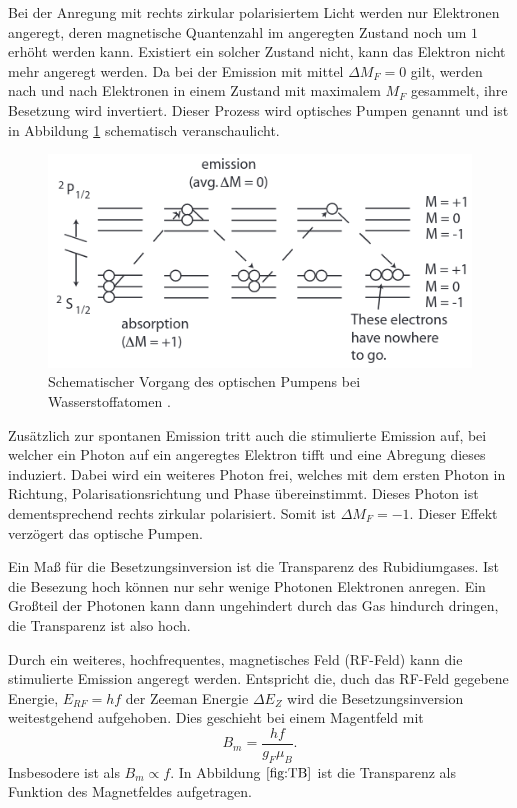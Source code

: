 \noindent
Bei der Anregung mit rechts zirkular polarisiertem Licht werden nur 
Elektronen angeregt, deren magnetische Quantenzahl im angeregten 
Zustand noch um $\num{1}$ erhöht werden kann. Existiert ein solcher
Zustand nicht, kann das Elektron nicht mehr angeregt werden. Da bei 
der Emission mit mittel $\Delta M_F=0$ gilt, werden nach und nach 
Elektronen in einem Zustand mit maximalem $M_F$ gesammelt, ihre 
Besetzung wird invertiert. Dieser Prozess wird optisches Pumpen 
genannt und ist in Abbildung \ref{fig:pumpen} schematisch 
veranschaulicht.
\begin{figure}[H]
    \centering
    \includegraphics[scale= 0.5]{pictures/pumpen.png}
    \caption{Schematischer Vorgang des optischen Pumpens bei Wasserstoffatomen \cite{OpticalPumping}.}
    \label{fig:pumpen}
\end{figure}
\noindent
Zusätzlich zur spontanen Emission tritt auch die stimulierte Emission
auf, bei welcher ein Photon auf ein angeregtes Elektron tifft und 
eine Abregung dieses induziert. Dabei wird ein weiteres Photon 
frei, welches mit dem ersten Photon in Richtung, Polarisationsrichtung
und Phase übereinstimmt. Dieses Photon ist dementsprechend rechts zirkular
polarisiert. Somit ist $\Delta M_F=-1$. Dieser Effekt verzögert das 
optische Pumpen.

\noindent
Ein Maß für die Besetzungsinversion ist die Transparenz des 
Rubidiumgases. Ist die Besezung hoch können nur sehr wenige Photonen
Elektronen anregen. Ein Großteil der Photonen kann dann ungehindert
durch das Gas hindurch dringen, die Transparenz ist also hoch. 

\noindent
Durch ein weiteres, hochfrequentes, magnetisches Feld (RF-Feld) kann
die stimulierte Emission angeregt werden. Entspricht die, duch das
RF-Feld gegebene Energie, $E_{RF}=hf$ der Zeeman Energie $\Delta E_Z$
wird die Besetzungsinversion weitestgehend aufgehoben. Dies geschieht
bei einem Magentfeld mit 
\begin{equation}
    B_m=\frac{hf}{g_F\mu_B} .
\end{equation}
Insbesodere ist als $B_m\propto f$. In Abbildung $\ref{fig:TB}$ ist 
die Transparenz als Funktion des Magnetfeldes aufgetragen.

